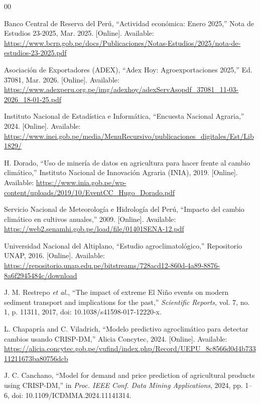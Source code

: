 \documentclass[conference]{IEEEtran}
\begin{document}
\begin{thebibliography}{00} 

 Banco Central de Reserva del Perú, ``Actividad económica: Enero 2025,'' Nota de Estudios 23-2025, Mar. 2025. [Online]. Available: \url{https://www.bcrp.gob.pe/docs/Publicaciones/Notas-Estudios/2025/nota-de-estudios-23-2025.pdf} 

 Asociación de Exportadores (ADEX), ``Adex Hoy: Agroexportaciones 2025,'' Ed. 37081, Mar. 2026. [Online]. Available: \url{https://www.adexperu.org.pe/img/adexhoy/adexServAsopdf_37081_11-03-2026_18-01-25.pdf} 

 Instituto Nacional de Estadística e Informática, ``Encuesta Nacional Agraria,'' 2024. [Online]. Available: \url{https://www.inei.gob.pe/media/MenuRecursivo/publicaciones_digitales/Est/Lib1829/} 

 H. Dorado, ``Uso de minería de datos en agricultura para hacer frente al cambio climático,'' Instituto Nacional de Innovación Agraria (INIA), 2019. [Online]. Available: \url{https://www.inia.gob.pe/wp-content/uploads/2019/10/EventCC_Hugo_Dorado.pdf} 

 Servicio Nacional de Meteorología e Hidrología del Perú, ``Impacto del cambio climático en cultivos anuales,'' 2009. [Online]. Available: \url{https://web2.senamhi.gob.pe/load/file/01401SENA-12.pdf} 

 Universidad Nacional del Altiplano, ``Estudio agroclimatológico,'' Repositorio UNAP, 2016. [Online]. Available: \url{https://repositorio.unap.edu.pe/bitstreams/728acd12-860d-4a89-8876-8a6f2945484c/download} 

 J. M. Restrepo \textit{et al.}, ``The impact of extreme El Niño events on modern sediment transport and implications for the past,'' \textit{Scientific Reports}, vol. 7, no. 1, p. 11311, 2017, doi: 10.1038/s41598-017-12220-x. 

 L. Chapapría and C. Viladrich, ``Modelo predictivo agroclimático para detectar cambios usando CRISP-DM,'' Alicia Concytec, 2024. [Online]. Available: \url{https://alicia.concytec.gob.pe/vufind/index.php/Record/UEPU_8c8566d0d4b73311211673ba80756dcb} 

 J. C. Canchano, ``Model for demand and price prediction of agricultural products using CRISP-DM,'' in \textit{Proc. IEEE Conf. Data Mining Applications}, 2024, pp. 1--6, doi: 10.1109/ICDMMA.2024.11141314. 


\end{thebibliography}
\end{document}
